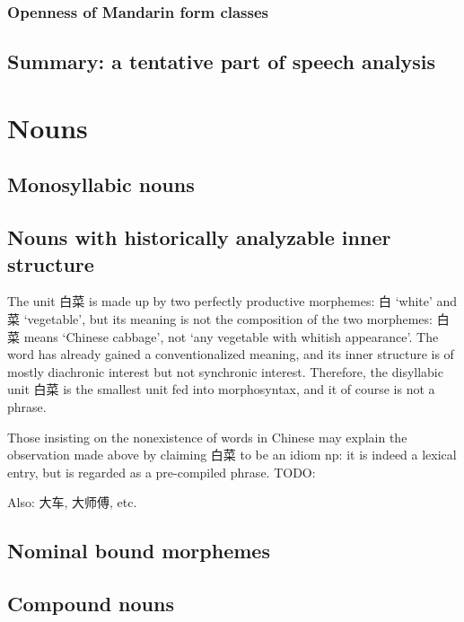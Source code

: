 \documentclass[UTF8, a4paper, oneside, scheme=plain]{ctexrep}
\newcommand{\translate}[1]{`#1'}
\begin{document}
\subsubsection{Openness of Mandarin form classes}

\subsection{Summary: a tentative part of speech analysis}

\section{Nouns}

\subsection{Monosyllabic nouns}

\subsection{Nouns with historically analyzable inner structure}\label{sec:pos.noun.fossilized-structure}

The unit 白菜 is made up by two perfectly productive morphemes:
白 \translate{white} and 菜 \translate{vegetable},
but its meaning is not the composition of the two morphemes:
白菜 means \translate{Chinese cabbage}, not \translate{any vegetable with whitish appearance}.
The word has already gained a conventionalized meaning,
and its inner structure is of mostly diachronic interest but not synchronic interest.
Therefore, the disyllabic unit 白菜 is the smallest unit fed into morphosyntax,
and it of course is not a phrase.

Those insisting on the nonexistence of words in Chinese 
may explain the observation made above 
by claiming 白菜 to be an idiom \ac{np}:
it is indeed a lexical entry,
but is regarded as a pre-compiled phrase. TODO: 

Also: 大车, 大师傅, etc.

\subsection{Nominal bound morphemes}

\subsection{Compound nouns}\label{sec:pos.noun.compound}
\end{document}
